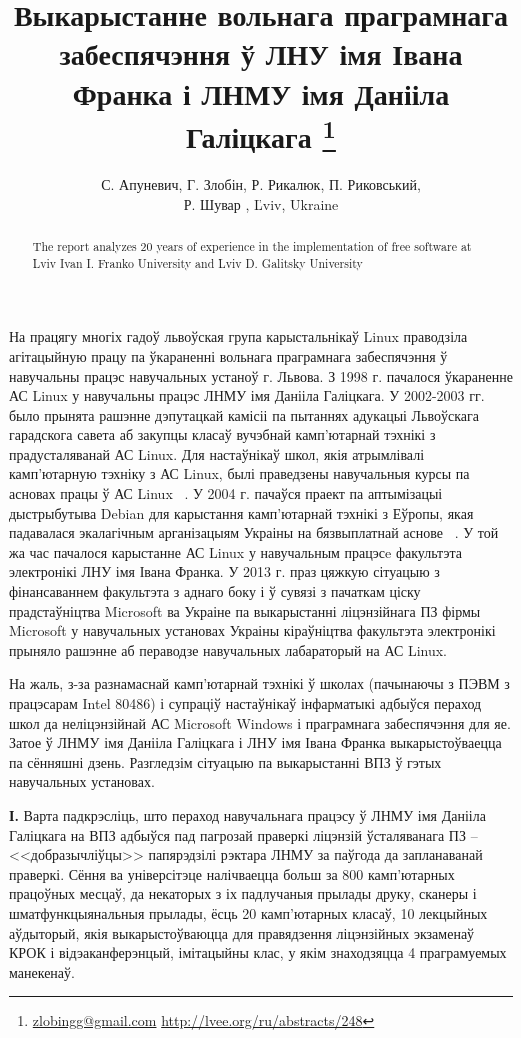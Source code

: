 \documentclass[10pt, a5paper]{article}
\begin{document}
\title{Выкарыстанне вольнага праграмнага забеспячэння ў ЛНУ імя Івана Франка і ЛНМУ імя Данііла Галіцкага \footnote{\url{zlobingg@gmail.com} \url{http://lvee.org/ru/abstracts/248}}}
\author{С. Апуневич, Г. Злобін, Р. Рикалюк, П. Риковський, \\ Р. Шувар , Ľviv, Ukraine}
\maketitle
\begin{abstract}
The report analyzes 20 years of experience in the implementation of free software at Lviv Ivan I. Franko University and Lviv D. Galitsky University
\end{abstract}

На працягу многіх гадоў львоўская група карыстальнікаў Linux праводзіла агітацыйную працу па ўкараненні вольнага праграмнага забеспячэння ў навучальны працэс навучальных устаноў г. Львова. З 1998 г. пачалося ўкараненне АС Linux у навучальны працэс ЛНМУ імя Данііла Галіцкага. У 2002-2003 гг. было прынята рашэнне дэпутацкай камісіі па пытаннях адукацыі Львоўскага гарадскога савета аб закупцы класаў вучэбнай камп'ютарнай тэхнікі з прадусталяванай АС Linux. Для настаўнікаў школ, якія атрымлівалі камп'ютарную тэхніку з АС Linux, былі праведзены навучальныя курсы па асновах працы ў АС Linux ~\cite{Zlobin-1}. У 2004 г. пачаўся праект па аптымізацыі дыстрыбутыва Debian для карыстання камп'ютарнай тэхнікі з Еўропы, якая падавалася экалагічным арганізацыям Украіны на бязвыплатнай аснове ~\cite{Zlobin-2}. У той жа час пачалося карыстанне АС Linux у навучальным працэсe факультэта электронікі ЛНУ імя Івана Франка. У 2013 г. праз цяжкую сітуацыю з фінансаваннем факультэта з аднаго боку і ў сувязі з пачаткам ціску прадстаўніцтва Microsoft ва Украіне па выкарыстанні ліцэнзійнага ПЗ фірмы Microsoft у навучальных установах Украіны кіраўніцтва факультэта электронікі прыняло рашэнне аб пераводзе навучальных лабараторый на АС Linux.

На жаль, з-за разнамаснай камп'ютарнай тэхнікі ў школах (пачынаючы з ПЭВМ з працэсарам Intel 80486) і супраціў настаўнікаў інфарматыкі адбыўся пераход школ да неліцэнзійнай АС Microsoft Windows і праграмнага забеспячэння для яе. Затое ў ЛНМУ імя Данііла Галіцкага і ЛНУ імя Івана Франка выкарыстоўваецца па сённяшні дзень. Разгледзім сітуацыю па выкарыстанні ВПЗ ў гэтых навучальных установах.

\textbf{І.} Варта падкрэсліць, што пераход навучальнага працэсу ў ЛНМУ імя Данііла Галіцкага на ВПЗ адбыўся пад пагрозай праверкі ліцэнзій ўсталяванага ПЗ -- <<добразычліўцы>> папярэдзілі рэктара ЛНМУ за паўгода да запланаванай праверкі. Сёння ва універсітэце налічваецца больш за 800 камп'ютарных працоўных месцаў,  да некаторых з іх падлучаныя прылады друку, сканеры і шматфункцыянальныя прылады, ёсць 20 камп'ютарных класаў, 10 лекцыйных аўдыторый, якія выкарыстоўваюцца для правядзення ліцэнзійных экзаменаў КРОК і відэаканферэнцый, імітацыйны клас, у якім знаходзяцца 4 праграмуемых манекенаў.
\end{document}
